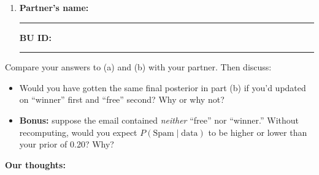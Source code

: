 \documentclass{article}
\newcommand{\nameblank}{\rule{1.75in}{0.4pt}}
\newcommand{\idblank}{\rule{1.55in}{0.4pt}}
\begin{document}
\begin{enumerate}[label=\arabic*.,leftmargin=*,itemsep=.7em, start=2]
  \item \textbf{Partner's name:} \nameblank \hfill \textbf{BU ID:} \idblank
\end{enumerate}

Compare your answers to (a) and (b) with your partner. Then discuss:

\begin{itemize}
  \item Would you have gotten the same final posterior in part (b) if you'd updated on ``winner'' first and ``free'' second? Why or why not?
  \item \textbf{Bonus:} suppose the email contained \emph{neither} ``free'' nor ``winner.'' Without recomputing, would you expect $P(\text{Spam} \mid \text{data})$ to be higher or lower than your prior of 0.20? Why?
\end{itemize}

\textbf{Our thoughts:}
\vfill
\end{document}
